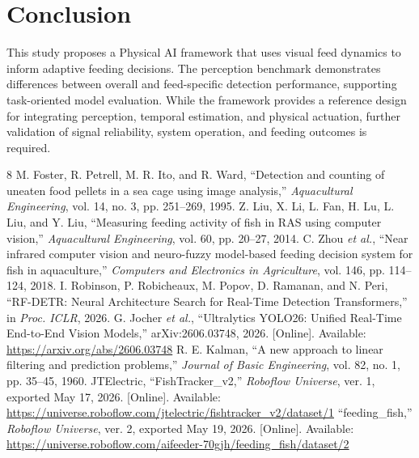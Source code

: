\documentclass[10pt,conference,letterpaper]{IEEEtran}
\begin{document}
\section{Conclusion}
This study proposes a Physical AI framework that uses visual feed dynamics to inform adaptive feeding decisions. The perception benchmark demonstrates differences between overall and feed-specific detection performance, supporting task-oriented model evaluation. While the framework provides a reference design for integrating perception, temporal estimation, and physical actuation, further validation of signal reliability, system operation, and feeding outcomes is required.

\begin{thebibliography}{8}
 M. Foster, R. Petrell, M. R. Ito, and R. Ward, ``Detection and counting of uneaten food pellets in a sea cage using image analysis,'' \emph{Aquacultural Engineering}, vol. 14, no. 3, pp. 251--269, 1995.
 Z. Liu, X. Li, L. Fan, H. Lu, L. Liu, and Y. Liu, ``Measuring feeding activity of fish in RAS using computer vision,'' \emph{Aquacultural Engineering}, vol. 60, pp. 20--27, 2014.
 C. Zhou \emph{et al.}, ``Near infrared computer vision and neuro-fuzzy model-based feeding decision system for fish in aquaculture,'' \emph{Computers and Electronics in Agriculture}, vol. 146, pp. 114--124, 2018.
 I. Robinson, P. Robicheaux, M. Popov, D. Ramanan, and N. Peri, ``RF-DETR: Neural Architecture Search for Real-Time Detection Transformers,'' in \emph{Proc. ICLR}, 2026.
 G. Jocher \emph{et al.}, ``Ultralytics YOLO26: Unified Real-Time End-to-End Vision Models,'' arXiv:2606.03748, 2026. [Online]. Available: \url{https://arxiv.org/abs/2606.03748}
 R. E. Kalman, ``A new approach to linear filtering and prediction problems,'' \emph{Journal of Basic Engineering}, vol. 82, no. 1, pp. 35--45, 1960.
 JTElectric, ``FishTracker\_v2,'' \emph{Roboflow Universe}, ver. 1, exported May 17, 2026. [Online]. Available: \url{https://universe.roboflow.com/jtelectric/fishtracker_v2/dataset/1}
 ``feeding\_fish,'' \emph{Roboflow Universe}, ver. 2, exported May 19, 2026. [Online]. Available: \url{https://universe.roboflow.com/aifeeder-70gjh/feeding_fish/dataset/2}
\end{thebibliography}
\end{document}
